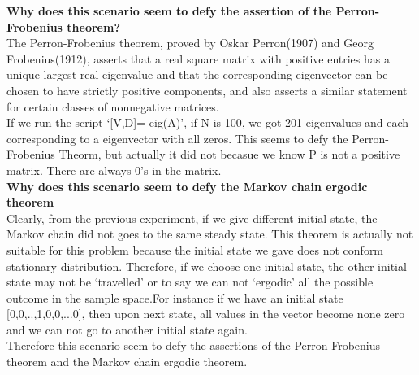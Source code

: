 \documentclass[twoside]{article}
\begin{document}
\noindent \textbf {Why does this scenario seem to defy the assertion of the Perron-Frobenius theorem?}\\
The Perron-Frobenius theorem, proved by Oskar Perron(1907) and Georg Frobenius(1912), asserts that a real square matrix with positive entries has a unique largest real eigenvalue and that the corresponding eigenvector can be chosen to have strictly positive components, and also asserts a similar statement for certain classes of nonnegative matrices.\\
If we run the script `[V,D]= eig(A)', if N is 100, we got 201 eigenvalues and each corresponding to a eigenvector with all zeros. This seems to defy the Perron-Frobenius Theorm, but actually it did not becasue we know P is not a positive matrix. There are always 0's in the matrix.\\
\noindent \textbf {Why does this scenario seem to defy the Markov chain ergodic theorem}\\
Clearly, from the previous experiment, if we give different initial state, the Markov chain did not goes to the same steady state. This theorem is actually not suitable for this problem because the initial state we gave does not conform stationary distribution. Therefore, if we choose one initial state, the other initial state may not be `travelled' or to say we can not `ergodic' all the possible outcome in the sample space.For instance if we have an initial state [0,0,..,1,0,0,...0], then upon next state, all values in the vector become none zero and we can not go to another initial state again.\\ 
Therefore this scenario seem to defy the assertions of the Perron-Frobenius theorem and the Markov chain ergodic theorem.\\ 
\end{document}
